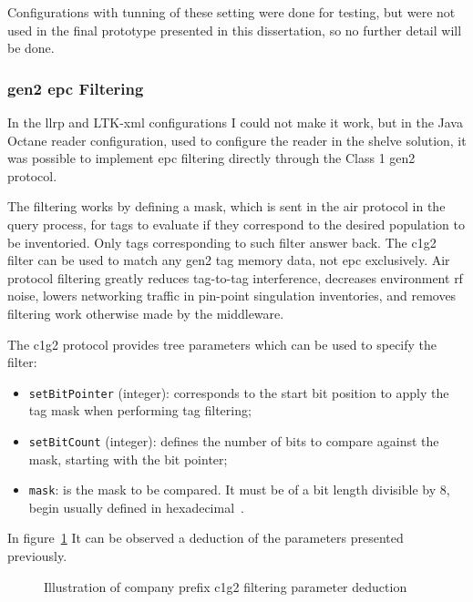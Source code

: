 Configurations with tunning of these setting were done for testing, but were not used in the final prototype presented in this dissertation, so no further detail will be done.

\subsubsection{\ac{gen2} \ac{epc} Filtering}

In the \ac{llrp} and LTK-\ac{xml} configurations I could not make it work, but in the Java Octane reader configuration, used to configure the reader in the shelve solution, it was possible to implement \ac{epc} filtering directly through the Class 1 \ac{gen2} protocol.

The filtering works by defining a mask, which is sent in the air protocol in the query process, for tags to evaluate if they correspond to the desired population to be inventoried. Only tags corresponding to such filter answer back.
The \ac{c1g2} filter can be used to match any \ac{gen2} tag memory data, not \ac{epc} exclusively.
Air protocol filtering greatly reduces tag-to-tag interference, decreases environment \ac{rf} noise, lowers networking traffic in pin-point singulation inventories, and removes filtering work otherwise made by the middleware.

The \ac{c1g2} protocol provides tree parameters which can be used to specify the filter: 

\begin{itemize}
  \item \texttt{setBitPointer} (integer): corresponds to the start bit position to apply the tag mask when performing tag filtering;
  \item \texttt{setBitCount} (integer): defines the number of bits to compare against the mask, starting with the bit pointer;
  \item \texttt{mask}: is the mask to be compared. It must be of a bit length divisible by $8$, begin usually defined in hexadecimal~\cite{LowLevelReader}.
\end{itemize}

In figure~\ref{fig:c1g2filter} It can be observed a deduction of the parameters presented previously.


\begin{figure}
  \centering
  \caption{Illustration of company prefix \ac{c1g2} filtering parameter deduction}
  \label{fig:c1g2filter}
\end{figure}


